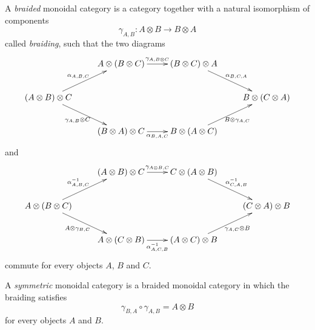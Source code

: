 \begin{definition}
A \emph{braided} monoidal category is a category together with a natural isomorphism of components
\begin{equation*}
\gamma_{A,B}:A\otimes B\to B\otimes A
\end{equation*}
called \emph{braiding}, such that the two diagrams
\begin{equation*}
\xymatrix{
& A\otimes(B\otimes C)\ar[r]^{\gamma_{A,B\otimes C}}& (B\otimes C)\otimes A\ar[dr]^{\alpha_{B,C,A}}\\
(A\otimes B)\otimes C\ar[ur]^{\alpha_{A,B,C}}\ar[dr]_{\gamma_{A,B}\otimes C}& & & B\otimes (C\otimes A)\\
& (B\otimes A)\otimes C\ar[r]_{\alpha_{B,A,C}}& B\otimes(A\otimes C)\ar[ur]_{B\otimes\gamma_{A,C}}\\
}
\end{equation*}
and
\begin{equation*}
\xymatrix{
& (A\otimes B)\otimes C\ar[r]^{\gamma_{A\otimes B,C}}& C\otimes (A\otimes B)\ar[dr]^{\alpha^{-1}_{C,A,B}}& \\
A\otimes (B\otimes C)\ar[ur]^{\alpha^{-1}_{A,B,C}}\ar[dr]_{A\otimes\gamma_{B,C}}& & & (C\otimes A)\otimes B\\
& A\otimes(C\otimes B)\ar[r]_{\alpha^{-1}_{A,C,B}}& (A\otimes C)\otimes B\ar[ur]_{\gamma_{A,C}\otimes B}& \\
}
\end{equation*}
commute for every objects $A$, $B$ and $C$.

A \emph{symmetric} monoidal category is a braided monoidal category in which the braiding satisfies
\begin{equation*}
\gamma_{B,A}\circ\gamma_{A,B}=A\otimes B
\end{equation*}
for every objects $A$ and $B$.
\end{definition}


